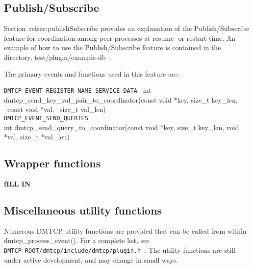 \documentclass{article}
\begin{document}
\subsection{Publish/Subscribe}

Section~ref{sec:publishSubscribe} provides an explanation of the Publish/Subscribe
feature for coordination among peer processes at resume- or restart-time.
An example of how to use the Publish/Subscribe feature is contained
in the directory, test/plugin/example-db~.

The primary events and functions used in this feature are:

\noindent
{\tt DMTCP\_EVENT\_REGISTER\_NAME\_SERVICE\_DATA} \
int dmtcp\_send\_key\_val\_pair\_to\_coordinator(const void *key,
                                                   size\_t key\_len, \
                                                   const void *val, \
                                                   size\_t val\_len) \\
{\tt DMTCP\_EVENT\_SEND\_QUERIES} \\
int dmtcp\_send\_query\_to\_coordinator(const void *key, size\_t key\_len,
                                            void *val, size\_t *val\_len)

\subsection{Wrapper functions}

{\bf fILL IN}

\subsection{Miscellaneous utility functions}

Numerous DMTCP utility functions are provided that can be called from within
dmtcp\_process\_event().  For a complete list, see
{\tt DMTCP\_ROOT/dmtcp/include/dmtcp/plugin.h}~.
The utility functions are still under active development, and may change
in small ways.
\end{document}
